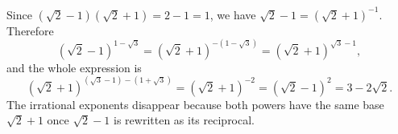 Since $\left(\sqrt2-1\right)\left(\sqrt2+1\right)=2-1=1$, we have $\sqrt2-1=\left(\sqrt2+1\right)^{-1}$. Therefore
\[\left(\sqrt2-1\right)^{1-\sqrt3}=\left(\sqrt2+1\right)^{-(1-\sqrt3)}=\left(\sqrt2+1\right)^{\sqrt3-1},\]
and the whole expression is
\[\left(\sqrt2+1\right)^{(\sqrt3-1)-(1+\sqrt3)}=\left(\sqrt2+1\right)^{-2}=\left(\sqrt2-1\right)^2=\boxed{3-2\sqrt2}.\]
The irrational exponents disappear because both powers have the same base $\sqrt2+1$ once $\sqrt2-1$ is rewritten as its reciprocal.
